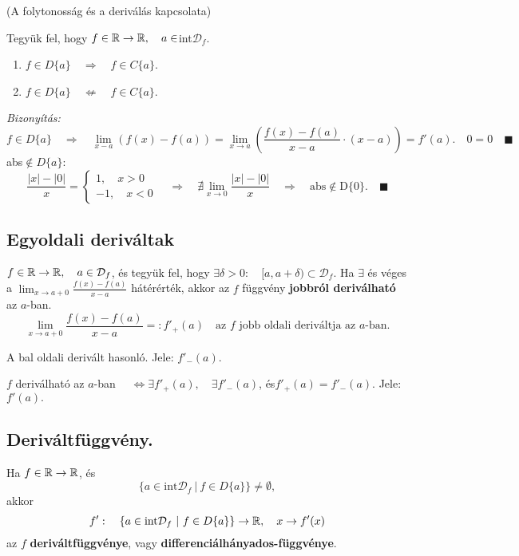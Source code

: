 \documentclass[a4paper,11.5pt]{article}
\begin{document}
	\begin{theorem}
		(A folytonosság és a deriválás kapcsolata)
		
		Tegyük fel, hogy $f\in\mathbb{R}\to\mathbb{R}, \quad a\in$int$\mathcal{D}_f$.
		\begin{enumerate}
			\item $f\in D\{a\}\quad \Rightarrow \quad f\in C\{a\}$.
			\item $f\in D\{a\}\quad \not\Leftarrow \quad f\in C\{a\}$.
		\end{enumerate}
		\textit{Bizonyítás:}
		\fbox{$\Rightarrow$}
		\[ f\in D\{a\}\quad \Rightarrow\quad \lim_{x-a}(f(x)-f(a))=\lim_{x\to a}\left(\frac{f(x)-f(a)}{x-a}\cdot(x-a)\right)=f'(a).\quad 0=0\quad \blacksquare \]
		\fbox{$\not\Leftarrow$} abs$\notin D\{a\}:$
		\[\frac{|x|-|0|}{x}=\left\{\begin{gathered}
		1,\quad x>0\\
		-1,\quad x<0
		\end{gathered}\right.\quad  \Rightarrow\quad \nexists\lim_{x\to 0}\frac{|x|-|0|}{x}\quad \Rightarrow\quad \text{abs}\notin\text{D}\{0\}.\quad \blacksquare \]
	\end{theorem}
	\subsection{Egyoldali deriváltak}
	\begin{definition}
		$f\in\mathbb{R}\to\mathbb{R},\quad a\in\mathcal{D}_f$, és tegyük fel, hogy $\exists\delta>0:\quad [a,a+\delta)\subset\mathcal{D}_f.$ Ha $\exists$ és véges a $\displaystyle \lim_{x\to a+0}\frac{f(x)-f(a)}{x-a}$ hátérérték, akkor az $f$ függvény \textbf{jobbról deriválható} az $a$-ban.
		\[\displaystyle \lim_{x\to a+0}\frac{f(x)-f(a)}{x-a} =:f'_+(a) \quad \text{az $f$ jobb oldali deriváltja az $a$-ban.} \]
	\end{definition}
	\begin{note}
		A bal oldali derivált hasonló. Jele: $f'_-(a)$.
	\end{note}
	\begin{note}
		$f$ deriválható az $a$-ban $\quad\Leftrightarrow \exists f'_+(a), \quad \exists f'_-(a)$, \quad és\quad  $ f'_+(a)=f'_-(a).$ \quad Jele:\quad $f'(a).$
	\end{note}
	\subsection{Deriváltfüggvény.}
	\begin{definition}
		Ha $f\in\mathbb{R}\to\mathbb{R}$, és 
		\[ \{ a\in\text{int}\mathcal{D}_f \ |\ f\in D\{a\} \}\not=\emptyset, \]
		akkor
		\[ f':\quad \{ a\in\text{int}\mathcal{D}_f \ |\ f\in D\{a\} \}\to\mathbb{R},\quad x\to f'(x) \]
		az $f$ \textbf{deriváltfüggvénye}, vagy \textbf{differenciálhányados-függvénye}.
	\end{definition}
\end{document}
